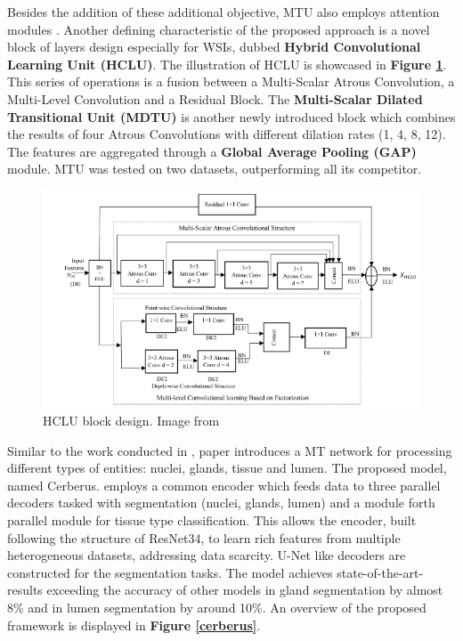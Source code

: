 Besides the addition of these additional objective, MTU also employs attention modules \cite{vaswani2017attention}. Another defining characteristic of the proposed approach is a novel block of layers design especially for WSIs, dubbed \textbf{Hybrid Convolutional Learning Unit (HCLU)}. The illustration of HCLU is showcased in \textbf{Figure \ref{hclu}}. This series of operations is a fusion between a Multi-Scalar Atrous Convolution, a Multi-Level Convolution and a Residual Block. The \textbf{Multi-Scalar Dilated Transitional Unit (MDTU)} is another newly introduced block which combines the results of four Atrous Convolutions with different dilation rates (1, 4, 8, 12). The features are aggregated through a \textbf{Global Average Pooling (GAP)} module. MTU was tested on two datasets, outperforming all its competitor.

\begin{figure}[htb]
    \centering
	\centerline{\includegraphics[scale=1]{figures/hclu.png}}
	\caption{HCLU block design. Image from \cite{dabass2022mtu}}
	\label{hclu}
\end{figure}

Similar to the work conducted in \cite{crawshaw2020multi}, paper \cite{graham2023one} introduces a MT network for processing different types of entities: nuclei, glands, tissue and lumen. The proposed model, named Cerberus. employs a common encoder which feeds data to three parallel decoders tasked with segmentation (nuclei, glands, lumen) and a module forth parallel module for tissue type classification. This allows the encoder, built following the structure of ResNet34, to learn rich features from multiple heterogeneous datasets, addressing data scarcity. U-Net like decoders are constructed for the segmentation tasks. The model achieves state-of-the-art-results exceeding the accuracy of other models in gland segmentation by almost 8\% and in lumen segmentation by around 10\%. An overview of the proposed framework is displayed in \textbf{Figure \ref{cerberus}}.

